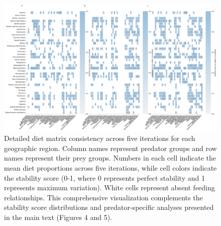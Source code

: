 \begin{landscape}
  \begin{figure}[p]
      \centering
      \includegraphics[width=\linewidth]{figures/diet_interaction_heatmap.png}
      \caption{Detailed diet matrix consistency across five iterations for each geographic region. Column names represent predator groups and row names represent their prey groups. Numbers in each cell indicate the mean diet proportions across five iterations, while cell colors indicate the stability score (0-1, where 0 represents perfect stability and 1 represents maximum variation). White cells represent absent feeding relationships. This comprehensive visualization complements the stability score distributions and predator-specific analyses presented in the main text (Figures 4 and 5).}
      \label{fig:diet_matrix_supp}
  \end{figure}
  \end{landscape}

